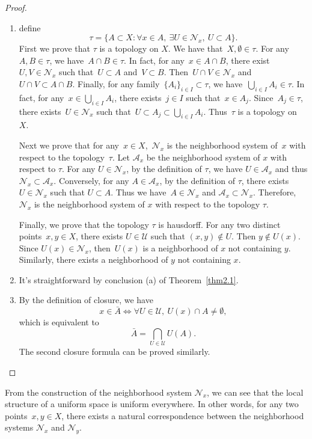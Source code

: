 \documentclass[12pt,a4paper,draft]{article}  %
\theoremstyle{definition}
\numberwithin{equation}{section}
\begin{document}
\begin{proof}
    \begin{enumerate}
        \item define
            $$ \tau = \{A \subset X: \forall x \in A,\ \exists U \in \mathcal{N}_x,\ U \subset A\}. $$
            First we prove that $\tau$ is a topology on $X$.
            We have that~$X,\emptyset \in \tau$. 
            For any~$A,B \in \tau$, we have~$A \cap B \in \tau$. In fact, for any~$x \in A \cap B$, 
            there exist~$U,V \in \mathcal{N}_x$ such that~$U \subset A$ and~$V \subset B$. 
            Then~$U \cap V \in \mathcal{N}_x$ and~$U \cap V \subset A \cap B$. 
            Finally, for any family~$\{A_i\}_{i \in I} \subset \tau$, we have~$\bigcup_{i \in I} A_i \in \tau$. 
            In fact, for any~$x \in \bigcup_{i \in I} A_i$, there exists~$j \in I$ such that~$x \in A_j$. 
            Since~$A_j \in \tau$, there exists~$U \in \mathcal{N}_x$ such that~$U \subset A_j \subset \bigcup_{i \in I} A_i$. 
            Thus~$\tau$ is a topology on~$X$.

            Next we prove that for any~$x \in X$,~$\mathcal{N}_x$ is the neighborhood system of~$x$ with respect to the topology~$\tau$.
            Let $\mathcal{A}_x$ be the neighborhood system of $x$ with respect to $\tau$.
            For any $U \in \mathcal{N}_x$, by the definition of $\tau$, we have $U \in \mathcal{A}_x$ and thus $\mathcal{N}_x \subset \mathcal{A}_x$.
            Conversely, for any $A \in \mathcal{A}_x$, by the definition of $\tau$, there exists $U \in \mathcal{N}_x$ such that $U \subset A$.
            Thus we have~$A \in \mathcal{N}_x$ and $\mathcal{A}_x \subset \mathcal{N}_x$.
            Therefore, $\mathcal{N}_x$ is the neighborhood system of $x$ with respect to the topology $\tau$.

            Finally, we prove that the topology $\tau$ is hausdorff.
            For any two distinct points~$x,y \in X$, there exists $U \in \mathcal{U}$ such that $(x,y) \notin U$.
            Then $y \notin U(x)$. Since $U(x) \in \mathcal{N}_x$,  then~$U(x)$ is a neighborhood of $x$ not containing $y$.
            Similarly, there exists a neighborhood of $y$ not containing $x$.
        \item It's straightforward by conclusion (a) of Theorem~\eqref{thm2.1}.
        \item By the definition of closure, we have
            $$ x \in \bar{A} \iff \forall U \in \mathcal{U},\ U(x) \cap A \neq \emptyset, $$
            which is equivalent to
            $$ \bar{A} = \bigcap_{U \in \mathcal{U}} U(A). $$
            The second closure formula can be proved similarly.
    \end{enumerate}
\end{proof}
From the construction of the neighborhood system $\mathcal{N}_x$, 
we can see that the local structure of a uniform space is uniform everywhere.
In other words, for any two points~$x,y \in X$, there exists a natural correspondence between the neighborhood systems $\mathcal{N}_x$ and $\mathcal{N}_y$.
\end{document}
